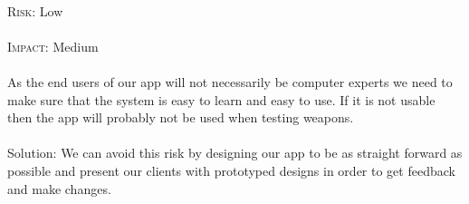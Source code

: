 \paragraph{}\textsc{Risk:} Low
\paragraph{}\textsc{Impact:} Medium
\paragraph{} As the end users of our app will not necessarily be computer experts we need to make sure that the system is easy to learn and easy to use. If it is not usable then the app will probably not be used when testing weapons.
\\
\\Solution: We can avoid this risk by designing our app to be as straight forward as possible and present our clients with prototyped designs in order to get feedback and make changes.